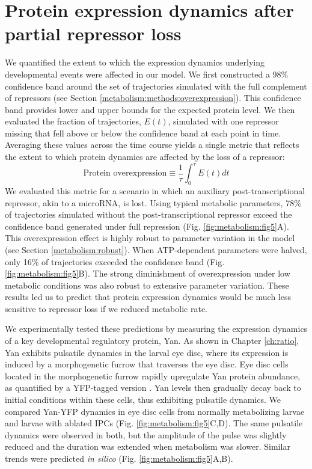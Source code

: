 \section{Protein expression dynamics after partial repressor loss}

We quantified the extent to which the expression dynamics underlying developmental events were affected in our model. We first constructed a 98\% confidence band around the set of trajectories simulated with the full complement of repressors (see Section \ref{metabolism:methods:overexpression}). This confidence band provides lower and upper bounds for the expected protein level. We then evaluated the fraction of trajectories, $E(t)$, simulated with one repressor missing that fell above or below the confidence band at each point in time. Averaging these values across the time course yields a single metric that reflects the extent to which protein dynamics are affected by the loss of a repressor:
\begin{equation}
\text{Protein overexpression} \equiv \frac{1}{\tau}\int_{0}^{\tau}{E(t)}dt
\end{equation}
We evaluated this metric for a scenario in which an auxiliary post-transcriptional repressor, akin to a microRNA, is lost. Using typical metabolic parameters, 78\% of trajectories simulated without the post-transcriptional repressor exceed the confidence band generated under full repression (Fig. \ref{fig:metabolism:fig5}A). This overexpression effect is highly robust to parameter variation in the model (see Section \ref{metabolism:robust}). When ATP-dependent parameters were halved, only 16\% of trajectories exceeded the confidence band (Fig. \ref{fig:metabolism:fig5}B). The strong diminishment of overexpression under low metabolic conditions was also robust to extensive parameter variation. These results led us to predict that protein expression dynamics would be much less sensitive to repressor loss if we reduced metabolic rate.

We experimentally tested these predictions by measuring the expression dynamics of a key developmental regulatory protein, Yan. As shown in Chapter \ref{ch:ratio}, Yan exhibits pulsatile dynamics in the larval eye disc, where its expression is induced by a morphogenetic furrow that traverses the eye disc. Eye disc cells located in the morphogenetic furrow rapidly upregulate Yan protein abundance, as quantified by a YFP-tagged version \cite{Pelaez2015a}. Yan levels then gradually decay back to initial conditions within these cells, thus exhibiting pulsatile dynamics. We compared Yan-YFP dynamics in eye disc cells from normally metabolizing larvae and larvae with ablated IPCs (Fig. \ref{fig:metabolism:fig5}C,D). The same pulsatile dynamics were observed in both, but the amplitude of the pulse was slightly reduced and the duration was extended when metabolism was slower. Similar trends were predicted \textit{in silico} (Fig. \ref{fig:metabolism:fig5}A,B).

